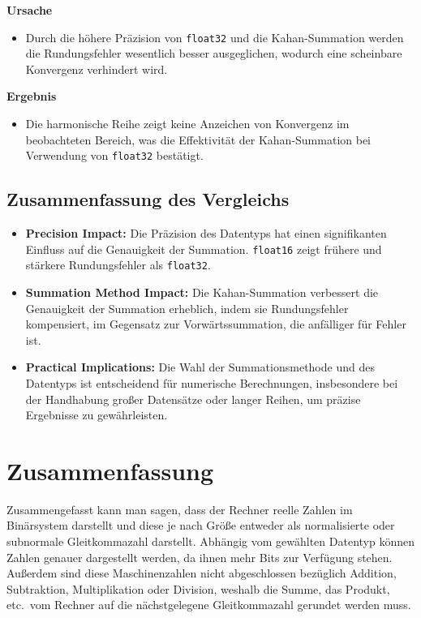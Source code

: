 \documentclass{scrartcl}
\begin{document}
\textbf{Ursache}
\begin{itemize}
    \item Durch die höhere Präzision von \texttt{float32} und die Kahan-Summation werden die Rundungsfehler wesentlich besser ausgeglichen, wodurch eine scheinbare Konvergenz verhindert wird.
\end{itemize}

\textbf{Ergebnis}
\begin{itemize}
    \item Die harmonische Reihe zeigt keine Anzeichen von Konvergenz im beobachteten Bereich, was die Effektivität der Kahan-Summation bei Verwendung von \texttt{float32} bestätigt.
\end{itemize}

\subsection{Zusammenfassung des Vergleichs}

\begin{itemize}
    \item \textbf{Precision Impact:}
          Die Präzision des Datentyps hat einen signifikanten Einfluss auf die
          Genauigkeit der Summation.
          \texttt{float16} zeigt frühere und stärkere Rundungsfehler als \texttt{float32}.
    \item \textbf{Summation Method Impact:}
          Die Kahan-Summation verbessert die Genauigkeit der Summation erheblich, indem
          sie Rundungsfehler kompensiert, im Gegensatz zur Vorwärtssummation, die
          anfälliger für Fehler ist.
    \item \textbf{Practical Implications:}
          Die Wahl der Summationsmethode und des Datentyps ist entscheidend für
          numerische Berechnungen, insbesondere bei der Handhabung großer Datensätze oder
          langer Reihen, um präzise Ergebnisse zu gewährleisten.
\end{itemize}

\section{Zusammenfassung}
Zusammengefasst kann man sagen, dass der Rechner reelle Zahlen im Binärsystem
darstellt und diese je nach Größe entweder als normalisierte oder subnormale
Gleitkommazahl darstellt.
Abhängig vom gewählten Datentyp können Zahlen genauer dargestellt werden, da
ihnen mehr Bits zur Verfügung stehen.
Außerdem sind diese Maschinenzahlen nicht abgeschlossen bezüglich Addition,
Subtraktion, Multiplikation oder Division, weshalb die Summe, das Produkt,
etc.\ vom Rechner auf die nächstgelegene Gleitkommazahl gerundet werden muss.
\end{document}
